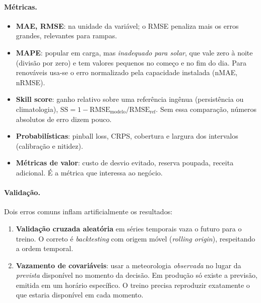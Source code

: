 \documentclass[11pt,a4paper]{article}
\begin{document}
\paragraph{Métricas.}
\begin{itemize}
  \item \textbf{MAE, RMSE}: na unidade da variável; o RMSE penaliza mais os
    erros grandes, relevantes para rampas.
  \item \textbf{MAPE}: popular em carga, mas \emph{inadequado para solar}, que
    vale zero à noite (divisão por zero) e tem valores pequenos no começo e
    no fim do dia. Para renováveis usa-se o erro normalizado pela capacidade
    instalada (nMAE, nRMSE).
  \item \textbf{Skill score}: ganho relativo sobre uma referência ingênua
    (persistência ou climatologia),
    $\mathrm{SS} = 1 - \mathrm{RMSE}_{\text{modelo}}/\mathrm{RMSE}_{\text{ref}}$.
    Sem essa comparação, números absolutos de erro dizem pouco.
  \item \textbf{Probabilísticas}: pinball loss, CRPS, cobertura e largura dos
    intervalos (calibração e nitidez).
  \item \textbf{Métricas de valor}: custo de desvio evitado, reserva poupada,
    receita adicional. É a métrica que interessa ao negócio.
\end{itemize}

\paragraph{Validação.} Dois erros comuns inflam artificialmente os resultados:
\begin{enumerate}
  \item \textbf{Validação cruzada aleatória} em séries temporais vaza o
    futuro para o treino. O correto é \textit{backtesting} com origem móvel
    (\textit{rolling origin}), respeitando a ordem temporal.
  \item \textbf{Vazamento de covariáveis}: usar a meteorologia
    \emph{observada} no lugar da \emph{prevista} disponível no momento da
    decisão. Em produção só existe a previsão, emitida em um horário
    específico. O treino precisa reproduzir exatamente o que estaria
    disponível em cada momento.
\end{enumerate}
\end{document}
